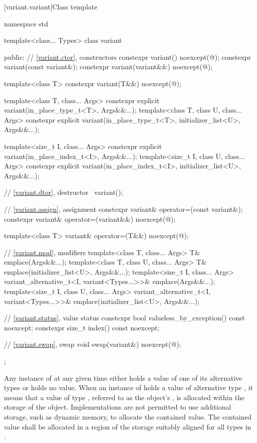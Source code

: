 %
[variant.variant]{Class template }

\begin{codeblock}
namespace std {
  template<class... Types>
  class variant {
  public:
    // \ref{variant.ctor}, constructors
    constexpr variant() noexcept(@\seebelow@);
    constexpr variant(const variant&);
    constexpr variant(variant&&) noexcept(@\seebelow@);

    template<class T>
      constexpr variant(T&&) noexcept(@\seebelow@);

    template<class T, class... Args>
      constexpr explicit variant(in_place_type_t<T>, Args&&...);
    template<class T, class U, class... Args>
      constexpr explicit variant(in_place_type_t<T>, initializer_list<U>, Args&&...);

    template<size_t I, class... Args>
      constexpr explicit variant(in_place_index_t<I>, Args&&...);
    template<size_t I, class U, class... Args>
      constexpr explicit variant(in_place_index_t<I>, initializer_list<U>, Args&&...);

    // \ref{variant.dtor}, destructor
    ~variant();

    // \ref{variant.assign}, assignment
    constexpr variant& operator=(const variant&);
    constexpr variant& operator=(variant&&) noexcept(@\seebelow@);

    template<class T> variant& operator=(T&&) noexcept(@\seebelow@);

    // \ref{variant.mod}, modifiers
    template<class T, class... Args>
      T& emplace(Args&&...);
    template<class T, class U, class... Args>
      T& emplace(initializer_list<U>, Args&&...);
    template<size_t I, class... Args>
      variant_alternative_t<I, variant<Types...>>& emplace(Args&&...);
    template<size_t I, class U, class... Args>
      variant_alternative_t<I, variant<Types...>>& emplace(initializer_list<U>, Args&&...);

    // \ref{variant.status}, value status
    constexpr bool valueless_by_exception() const noexcept;
    constexpr size_t index() const noexcept;

    // \ref{variant.swap}, swap
    void swap(variant&) noexcept(@\seebelow@);
  };
}
\end{codeblock}

\pnum
Any instance of  at any given time either holds a value
of one of its alternative types or holds no value.
When an instance of  holds a value of alternative type ,
it means that a value of type , referred to as the 
object's , is allocated within the storage of the
 object.
Implementations are not permitted to use additional storage, such as dynamic
memory, to allocate the contained value.
The contained value shall be allocated in a region of the 
storage suitably aligned for all types in .

